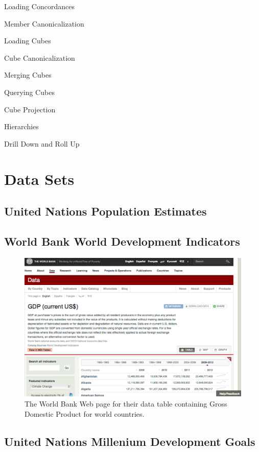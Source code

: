 Loading Concordances

Member Canonicalization 

Loading Cubes

Cube Canonicalization 

Merging Cubes

Querying Cubes

Cube Projection

Hierarchies

Drill Down and Roll Up

\section{Data Sets}
\subsection{United Nations Population Estimates}
\subsection{World Bank World Development Indicators}
\begin{figure}[h]
  \caption{The World Bank Web page for their data table containing Gross Domestic Product for world countries.}
  \centering
  \includegraphics[width=\textwidth]{figures/worldBankGDP.png}
\end{figure}
\subsection{United Nations Millenium Development Goals}
